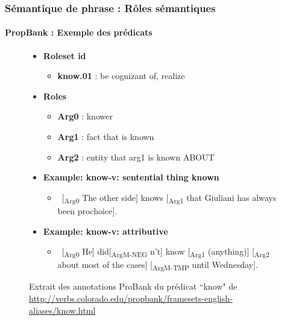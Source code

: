 \documentclass[xcolor=table]{beamer}
\begin{document}
\begin{frame}
\frametitle{Sémantique de phrase : Rôles sémantiques}
\framesubtitle{PropBank : Exemple des prédicats}
	
\vspace{-6pt}
\begin{figure}
	\scriptsize
	\begin{itemize}
		\item \textbf{Roleset id}
		\begin{itemize}\scriptsize
			\item \textbf{know.01} : be cognizant of, realize
		\end{itemize}
		\item \textbf{Roles}
		\begin{itemize}\scriptsize
			\item \textbf{Arg0} : knower
			\item \textbf{Arg1} : fact that is known
			\item \textbf{Arg2} : entity that arg1 is known ABOUT
		\end{itemize}
	
		\item \textbf{Example: know-v: sentential thing known}
		\begin{itemize}\scriptsize
			\item \ [\textsubscript{\color{red}Arg0} The other side] knows [\textsubscript{\color{red}Arg1} that Giuliani has always been prochoice].
		\end{itemize}
	
		\item \textbf{Example: know-v: attributive}
		\begin{itemize}\scriptsize
			\item \ [\textsubscript{\color{red}Arg0} He] did[\textsubscript{\color{red}ArgM-NEG} n't] know [\textsubscript{\color{red}Arg1} (anything)] [\textsubscript{\color{red}Arg2} about most of the cases] [\textsubscript{\color{red}ArgM-TMP} until Wednesday].
		\end{itemize}
	\end{itemize}
		
	\caption{Extrait des annotations ProBank du prédicat ``know" de \url{http://verbs.colorado.edu/propbank/framesets-english-aliases/know.html}}
\end{figure}
	
\end{frame}

%
%	
%	
\end{document}
